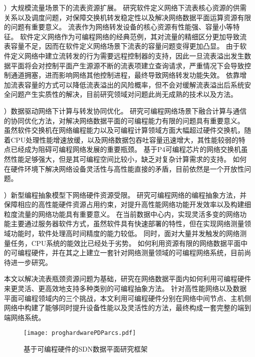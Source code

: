 {）大规模流量场景下的流表资源扩展。}
研究软件定义网络下流表核心资源的供需关系以及调度问题，对保障交换机转发稳定性以及解决网络数据平面运算资源有限的问题有重要意义。
流表作为网络转发设备的核心资源有性能强、容量小等特征。
软件定义网络作为可编程网络的经典范例，其对流量的精细区分更加导致流表容量不足，因而在软件定义网络场景下流表的容量问题变得更加凸显。
由于软件定义网络中建立流转发的行为需要远程控制器的支持，因此一旦流表溢出发生数据平面将会对控制平面产生源源不断的流表项建立查询请求，严重情况下会导致控制通道拥塞，进而影响网络其他控制进程，最终导致网络转发功能失效。
依靠增加流表容量的方式可以降低流表溢出的风险概率，但不会对缓解流表溢出后系统安全问题产生实质性的解决，目前研究领域对问题此尚无成熟的技术以及方法。

{）数据驱动网络下计算与转发协同优化。}
研究可编程网络场景下融合计算与通信的协同优化方法，对解决网络数据平面的可编程能力有限的问题具有重要意义。
虽然软件交换机在网络编程能力以及可编程计算领域方面大幅超过硬件交换机，随着CPU处理性能增速放缓，以及网络数据包吞吐容量迅速增大，其性能较弱的特点已经成为阻碍可编程网络发展的重要瓶颈。
基于P4可编程芯片的网络交换机虽然性能足够强大，但是其可编程空间比较小，缺乏对复杂计算需求的支持。
如何在硬件环境下解决网络设备灵活性与高性能直接的矛盾，目前依然是一个开放性问题。

{）新型编程抽象模型下网络硬件资源受限。}
研究可编程网络的编程抽象方法，并保障相应的高性能硬件资源占用约束，对提升高性能网络功能开发效率以及构建细粒度流量的网络功能具有重要意义。
在当前数据中心内，实现灵活多变的网络功能主要通过服务器软件方式，虽然软件具有快速部署的特性，但在实现网络测量领域功能时，软件处理高时间精度的能力较低。
同时，面对大量并发触发的网络测量任务，CPU系统的能效比已经处于劣势。
如何利用资源有限的网络数据平面中的可编程硬件，并在其之上建立一套针对网络测量领域的可编程网络系统，目前尚待进一步研究。

\label{chap132}
本文以解决流表瓶颈资源问题为基础，研究在网络数据平面内如何利用可编程硬件来更灵活、更高效地支持多种类别的可编程抽象方法。
针对高性能网络以及数据平面可编程领域内的三个挑战，本文利用可编程硬件分别在网络中间节点、主机侧网络中构建了能够同时提升设备性能以及灵活性的方法，最终构成一套完整的端到端网络系统。

\begin{figure}[!ht]
	\centering 
	\vspace{-1.5mm} 
	\texttt{[image: proghardwarePDParcs.pdf]}
	\caption{基于可编程硬件的SDN数据平面研究框架} \label{fig:proghardwarePDParcs}
\end{figure}

